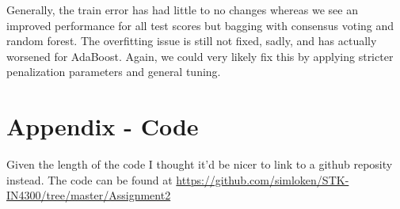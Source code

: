 \documentclass{article}
\begin{document}
Generally, the train error has had little to no changes whereas we see an improved performance for all test scores but bagging with consensus voting and random forest. The overfitting issue is still not fixed, sadly, and has actually worsened for AdaBoost. Again, we could very likely fix this by applying stricter penalization parameters and general tuning.


\newpage
\section*{Appendix - Code}
Given the length of the code I thought it'd be nicer to link to a github reposity instead. \newline
The code can be found at \url{https://github.com/simloken/STK-IN4300/tree/master/Assignment2}
\end{document}
